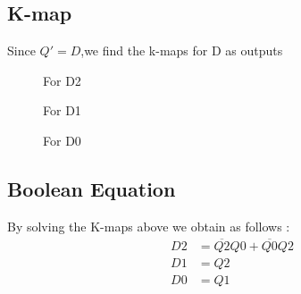 \documentclass[10pt,a4paper]{article}
\begin{document}
\subsection{K-map}
Since $Q'= D$,we find the k-maps for D as outputs\\
\begin{figure}[!h]                                
\begin{center}                                 
\resizebox{0.5\columnwidth}{!}{

}                                                
\end{center}                                     
\caption{For D2}                                       
\label{fig:for_D2}                             
\end{figure}
%
\begin{figure}[!h]                              
\begin{center}                                 
\resizebox{0.5\columnwidth}{!}{

}                                               
\end{center}                                   
\caption{For D1}                                     
\label{fig:for_D1}                             
\end{figure}
%
\begin{figure}[!h]                             
\begin{center}                                
\resizebox{0.5\columnwidth}{!}{

}                                              
\end{center}                              
\caption{For D0}                                
\label{fig:for_D1}                            
\end{figure}                                      
%
\subsection{Boolean Equation}
By solving the K-maps above we obtain as follows :
\begin{align}
	D2 &= \overline{Q2}Q0 + \overline{Q0}Q2 \\
	D1 &= Q2 \\
	D0 &= Q1 
\end{align}
\end{document}
